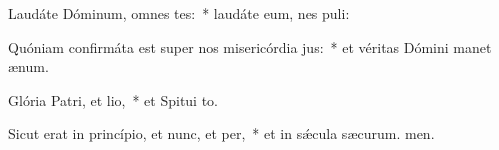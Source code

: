 \item Laudáte Dóminum, omnes tes:~* laudáte eum, nes puli:
\item Quóniam confirmáta est super nos misericórdia jus:~* et véritas Dómini manet  ænum.
\item Glória Patri, et lio,~* et Spitui to.
\item Sicut erat in princípio, et nunc, et per,~* et in sǽcula sæcurum. men.
